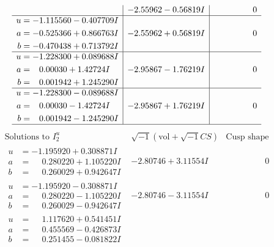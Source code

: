 \documentclass[1p]{elsarticle_modified}
\theoremstyle{definition}
\newcommand{\I}{\sqrt{-1}}
\begin{document}
$$\begin{array}{c|c|c}
 & -2.55962 - 0.56819 I & \phantom{-0.000000 } 0 \\ \hline\begin{aligned}
u &= -1.115560 - 0.407709 I \\
a &= -0.525366 + 0.866763 I \\
b &= -0.470438 + 0.713792 I\end{aligned}
 & -2.55962 + 0.56819 I & \phantom{-0.000000 } 0 \\ \hline\begin{aligned}
u &= -1.228300 + 0.089688 I \\
a &= \phantom{-}0.00030 + 1.42724 I \\
b &= \phantom{-}0.001942 + 1.245290 I\end{aligned}
 & -2.95867 - 1.76219 I & \phantom{-0.000000 } 0 \\ \hline\begin{aligned}
u &= -1.228300 - 0.089688 I \\
a &= \phantom{-}0.00030 - 1.42724 I \\
b &= \phantom{-}0.001942 - 1.245290 I\end{aligned}
 & -2.95867 + 1.76219 I & \phantom{-0.000000 } 0\\
 \hline 
 \end{array}$$\newpage$$\begin{array}{c|c|c}  
\text{Solutions to }I^u_{2}& \I (\text{vol} + \sqrt{-1}CS) & \text{Cusp shape}\\
 \hline 
\begin{aligned}
u &= -1.195920 + 0.308871 I \\
a &= \phantom{-}0.280220 + 1.105220 I \\
b &= \phantom{-}0.260029 + 0.942647 I\end{aligned}
 & -2.80746 + 3.11554 I & \phantom{-0.000000 } 0 \\ \hline\begin{aligned}
u &= -1.195920 - 0.308871 I \\
a &= \phantom{-}0.280220 - 1.105220 I \\
b &= \phantom{-}0.260029 - 0.942647 I\end{aligned}
 & -2.80746 - 3.11554 I & \phantom{-0.000000 } 0 \\ \hline\begin{aligned}
u &= \phantom{-}1.117620 + 0.541451 I \\
a &= \phantom{-}0.455569 - 0.426873 I \\
b &= \phantom{-}0.251455 - 0.081822 I\end{aligned}

\end{array}$$
\end{document}
